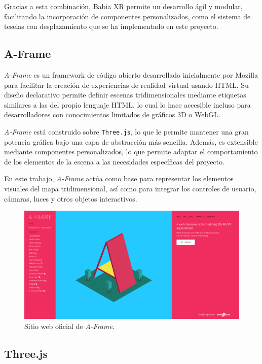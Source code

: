 \documentclass[a4paper, 12pt]{book}
\begin{document}
Gracias a esta combinación, Babia XR permite un desarrollo ágil y modular, facilitando la incorporación de componentes personalizados, como el sistema de teselas con desplazamiento que se ha implementado en este proyecto.


\subsection{A-Frame}
\label{subsec:aframe}

\textit{A-Frame} es un framework de código abierto desarrollado inicialmente por Mozilla para facilitar la creación de experiencias de realidad virtual usando HTML. Su diseño declarativo permite definir escenas tridimensionales mediante etiquetas similares a las del propio lenguaje HTML, lo cual lo hace accesible incluso para desarrolladores con conocimientos limitados de gráficos 3D o WebGL.

\textit{A-Frame} está construido sobre \texttt{Three.js}, lo que le permite mantener una gran potencia gráfica bajo una capa de abstracción más sencilla. Además, es extensible mediante componentes personalizados, lo que permite adaptar el comportamiento de los elementos de la escena a las necesidades específicas del proyecto.

En este trabajo, \textit{A-Frame} actúa como base para representar los elementos visuales del mapa tridimensional, así como para integrar los controles de usuario, cámaras, luces y otros objetos interactivos.

\begin{figure}[H]
  \centering
  \includegraphics[width=\textwidth]{img/aframe.png}
  \caption{Sitio web oficial de \textit{A-Frame}.}
  \label{fig:aframe-img}
\end{figure}


\subsection{Three.js}
\label{subsec:threejs}
\end{document}

